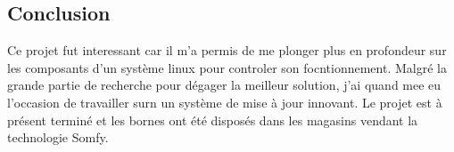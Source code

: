 \subsection{Conclusion}

Ce projet fut interessant car il m'a permis de me plonger plus en profondeur sur les composants d'un système linux pour controler son focntionnement.
Malgré la grande partie de recherche pour dégager la meilleur solution, j'ai quand mee eu l'occasion de travailler surn un système de mise à jour innovant.
Le projet est à présent terminé et les bornes ont été disposés dans les magasins vendant la technologie Somfy.